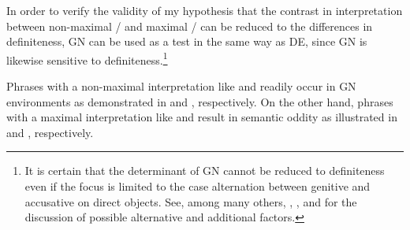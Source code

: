 \documentclass[output=paper,
colorlinks,
citecolor=brown,
newtxmath
]{langscibook}
\begin{document}
In order to verify the validity of my hypothesis that the contrast in interpretation between non-maximal / and maximal / can be reduced to the differences in definiteness, GN can be used as a test in the same way as DE, since GN is likewise sensitive to definiteness.\footnote{It is certain that the determinant of GN cannot be reduced to definiteness even if the focus is limited to the case alternation between genitive and accusative on direct objects. See, among many others, \citet{Timberlake1975}, \citet{Kagan2012}, and \cite{Geist2015} for the discussion of possible alternative and additional factors.
}

Phrases with a non-maximal interpretation like  and  readily occur in GN environments as demonstrated in  and , respectively. On the other hand, phrases with a maximal interpretation like  and  result in semantic oddity as illustrated in  and , respectively.
\end{document}
